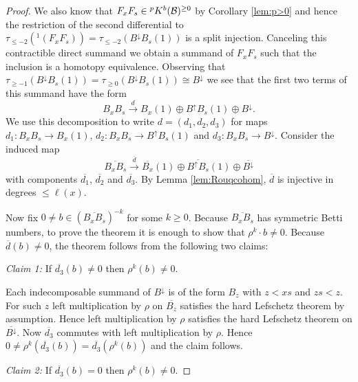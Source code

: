 \documentclass[11pt]{amsart}
\numberwithin{equation}{section}
\def\ov{\overline}
\def\to{\rightarrow}
\theoremstyle{definition}
\theoremstyle{remark}
\begin{document}
{\begin{proof}
We also know that $F_xF_s \in {}^pK^b({\mathcal{B}})^{\ge
  0}$ by Corollary \ref{lem:p>0}  and hence the restriction of the second differential to
$\tau_{\le -2}({}^1(F_xF_s)) = \tau_{\le -2}(B^{\downarrow} B_s(1))$ is
a split injection. Canceling this contractible direct summand we
obtain a summand of $F_xF_s$ such that the inclusion is a homotopy
equivalence. Observing that 
$\tau_{\ge -1}(B^\downarrow B_s(1)) = \tau_{\ge 0}(B^{\downarrow}B_s(1)) \cong
B^{\downarrow}$ we see that the first two terms of this summand have the
form
\[
B_xB_s \stackrel{d}{\longrightarrow} B_x(1) \oplus B^{\uparrow}B_s(1)
\oplus B^{\downarrow}.
\]
We use this decomposition to write $d =
(d_1, d_2, d_3)$ for maps $d_1 : B_xB_s \to B_x(1)$,
$d_2 :  B_xB_s \to B^{\uparrow}B_s(1)$ and  $d_3 : B_xB_s \to
B^{\downarrow}$. Consider the induced map
\[
\ov{B_xB_s}  \stackrel{\ov{d}}{\longrightarrow} \ov{B_x}(1) \oplus \ov{B^{\uparrow}B_s}(1)
\oplus \ov{B^{\downarrow}}
\]
with components $\ov{d_1}$, $\ov{d_2}$ and $\ov{d_3}$. By Lemma
\ref{lem:Rouqcohom}, $\overline{d}$ is
injective in degrees $\le \ell(x)$.

Now fix $0 \ne b \in (\ov{B_xB_s})^{-k}$ for some $k \ge 0$.
Because $\ov{B_xB_s}$ has symmetric Betti numbers, to prove the theorem
it is enough to show that $\rho^k \cdot b \ne 0$. Because $\ov{d}(b) \ne
0$, the theorem follows from the following two claims:

\emph{Claim 1:} If $\overline{d_3}(b) \ne 0$ then $\rho^k(b) \ne 0$.

Each indecomposable summand of $B^\downarrow$ is of the form $B_z$
with $z < xs$ and $zs < z$. For such $z$ left multiplication by
$\rho$ on $\overline{B_z}$ satisfies the hard Lefschetz theorem by
assumption. Hence left multiplication by $\rho$ satisfies the hard Lefschetz
theorem on $\overline{B^\downarrow}$. Now $\overline{d_3}$ commutes with left
multiplication by $\rho$. Hence $0 \ne \rho^k(\overline{d_3}(b)) =
\overline{d_3}(\rho^k(b))$ and the claim follows.

\emph{Claim 2:} If $\overline{d_3}(b) = 0$ then $\rho^k(b) \ne 0$.


\end{proof}}
\end{document}
